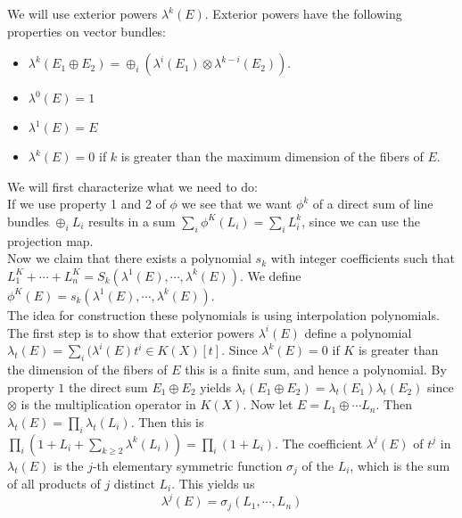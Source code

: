 \documentclass[../Thesis.tex]{subfiles}
\begin{document}
\begin{myproof}
We will use exterior powers $\lambda^k(E)$. Exterior powers have the following properties on vector bundles:
\begin{itemize}
\item $\lambda^ k(E_1 \oplus E_2) = \oplus_i(\lambda^ i(E_1) \otimes \lambda^ {k-i}(E_2))$.
\item $\lambda^0(E) = 1$
\item $\lambda^1(E) = E$
\item $\lambda^k(E) = 0$ if $k$ is greater than the maximum dimension of the fibers of $E$.
\end{itemize}
We will first characterize what we need to do:
\\If we use property 1 and 2 of $\phi$ we see that we want $\phi^k$ of a direct sum of line bundles $\oplus_i L_i$ results in a sum $\sum_i \phi^K(L_i) = \sum_i L_i^k$, since we can use the projection map.
\\Now we claim that there exists a polynomial $s_k$ with integer coefficients such that $L_1^K + \cdots + L_n^K = S_k(\lambda^ 1(E), \cdots, \lambda^k(E))$. We define $\phi^K(E) = s_k(\lambda^1(E), \cdots, \lambda^k(E))$.
\\The idea for construction these polynomials is using interpolation polynomials.
\\The first step is to show that exterior powers $\lambda^i(E)$ define a polynomial $\lambda_t(E) = \sum_i(\lambda^i(E)t^i \in K(X)[t]$. Since $\lambda^k(E) = 0$ if $K$ is greater than the dimension of the fibers of $E$ this is a finite sum, and hence a polynomial. By property $1$ the direct sum $E_1 \oplus E_2$ yields $\lambda_t(E_1 \oplus E_2) = \lambda_t(E_1) \lambda_t(E_2)$ since $\otimes$ is the multiplication operator in $K(X)$. Now let $E = L_1 \oplus \cdots L_n$. Then $\lambda_t(E) = \prod_i\lambda_t(L_i)$. Then this is $\prod_i( 1 + L_i + \sum_{k \geq 2} \lambda^k(L_i)) = \prod_i( 1 + L_i)$. The coefficient $\lambda^j(E)$ of $t^j$ in $\lambda_t(E)$ is the $j$-th elementary symmetric function $\sigma_j$ of the $L_i$, which is the sum of all products of $j$ distinct $L_i$. This yields us
\begin{equation}
\lambda^j(E) = \sigma_j(L_1, \cdots, L_n)
\end{equation}


\end{myproof}
\end{document}
